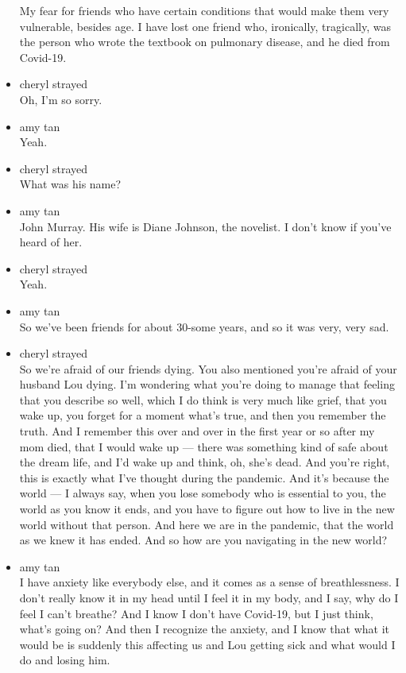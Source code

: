 \begin{itemize}
  My fear for friends who have certain conditions that would make them
  very vulnerable, besides age. I have lost one friend who, ironically,
  tragically, was the person who wrote the textbook on pulmonary
  disease, and he died from Covid-19.
\item
  cheryl strayed\\
  Oh, I'm so sorry.
\item
  amy tan\\
  Yeah.
\item
  cheryl strayed\\
  What was his name?
\item
  amy tan\\
  John Murray. His wife is Diane Johnson, the novelist. I don't know if
  you've heard of her.
\item
  cheryl strayed\\
  Yeah.
\item
  amy tan\\
  So we've been friends for about 30-some years, and so it was very,
  very sad.
\item
  cheryl strayed\\
  So we're afraid of our friends dying. You also mentioned you're afraid
  of your husband Lou dying. I'm wondering what you're doing to manage
  that feeling that you describe so well, which I do think is very much
  like grief, that you wake up, you forget for a moment what's true, and
  then you remember the truth. And I remember this over and over in the
  first year or so after my mom died, that I would wake up --- there was
  something kind of safe about the dream life, and I'd wake up and
  think, oh, she's dead. And you're right, this is exactly what I've
  thought during the pandemic. And it's because the world --- I always
  say, when you lose somebody who is essential to you, the world as you
  know it ends, and you have to figure out how to live in the new world
  without that person. And here we are in the pandemic, that the world
  as we knew it has ended. And so how are you navigating in the new
  world?
\item
  amy tan\\
  I have anxiety like everybody else, and it comes as a sense of
  breathlessness. I don't really know it in my head until I feel it in
  my body, and I say, why do I feel I can't breathe? And I know I don't
  have Covid-19, but I just think, what's going on? And then I recognize
  the anxiety, and I know that what it would be is suddenly this
  affecting us and Lou getting sick and what would I do and losing him.

\end{itemize}
